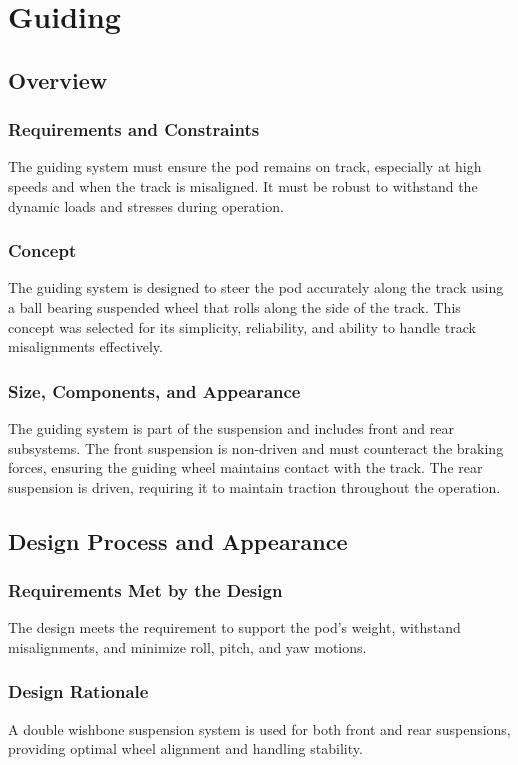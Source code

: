 \section{Guiding}

\subsection{Overview}
\subsubsection{Requirements and Constraints}
The guiding system must ensure the pod remains on track, especially at high speeds and when the track is misaligned. It must be robust to withstand the dynamic loads and stresses during operation.

\subsubsection{Concept}
The guiding system is designed to steer the pod accurately along the track using a ball bearing suspended wheel that rolls along the side of the track. This concept was selected for its simplicity, reliability, and ability to handle track misalignments effectively.

\subsubsection{Size, Components, and Appearance}
The guiding system is part of the suspension and includes front and rear subsystems. The front suspension is non-driven and must counteract the braking forces, ensuring the guiding wheel maintains contact with the track. The rear suspension is driven, requiring it to maintain traction throughout the operation.

\subsection{Design Process and Appearance}
\subsubsection{Requirements Met by the Design}
The design meets the requirement to support the pod's weight, withstand misalignments, and minimize roll, pitch, and yaw motions.

\subsubsection{Design Rationale}
A double wishbone suspension system is used for both front and rear suspensions, providing optimal wheel alignment and handling stability.

